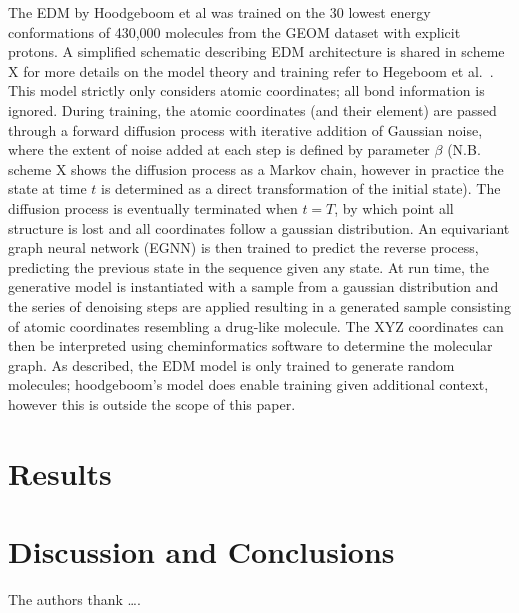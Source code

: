 \documentclass[journal=jacsat,manuscript=article]{achemso}
\begin{document}
The EDM by Hoodgeboom et al was trained on the 30 lowest energy conformations of 430,000 molecules from the GEOM dataset with explicit protons. A simplified schematic describing EDM architecture is shared in scheme X for more details on the model theory and training refer to Hegeboom et al.~\cite{}. This model strictly only considers atomic coordinates; all bond information is ignored. During training, the atomic coordinates (and their element) are passed through a forward diffusion process with iterative addition of Gaussian noise, where the extent of noise added at each step is defined by parameter $\beta$ (N.B. scheme X shows the diffusion process as a Markov chain, however in practice the state at time $t$ is determined as a direct transformation of the initial state). The diffusion process is eventually terminated when $t=T$, by which point all structure is lost and all coordinates follow a gaussian distribution. An equivariant graph neural network (EGNN) is then trained to predict the reverse process, predicting the previous state in the sequence given any state. At run time, the generative model is instantiated with a sample from a gaussian distribution and the series of denoising steps are applied resulting in a generated sample consisting of atomic coordinates resembling a drug-like molecule. The XYZ coordinates can then be interpreted using cheminformatics software to determine the molecular graph. As described, the EDM model is only trained to generate random molecules; hoodgeboom’s model does enable training given additional context, however this is outside the scope of this paper. 



\section{Results}


\section{Discussion and Conclusions}



\begin{acknowledgement}
The authors thank \ldots. 

\end{acknowledgement}




\end{document}
